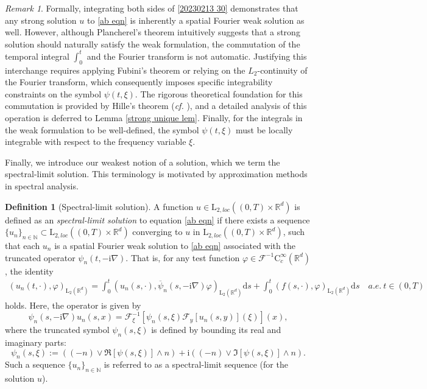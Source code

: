 \documentclass[11pt,reqno]{amsart}
\theoremstyle{definition}
\newtheorem{defn}[thm]{Definition}
\theoremstyle{remark}
\newtheorem{rem}[thm]{Remark}
\newcommand\bR{\mathbb{R}}
\numberwithin{equation}{section}
\begin{document}
\begin{rem}
									\label{strong weak rem}
Formally, integrating both sides of \eqref{20230213 30} demonstrates that any strong solution $u$ to \eqref{ab eqn} is inherently a spatial Fourier weak solution as well. 
However, although Plancherel’s theorem intuitively suggests that a strong solution should naturally satisfy the weak formulation, the commutation of the temporal integral $\int_0^t$ and the Fourier transform is not automatic. 
Justifying this interchange requires applying Fubini’s theorem or relying on the $L_2$-continuity of the Fourier transform, which consequently imposes specific integrability constraints on the symbol $\psi(t,\xi)$. 
The rigorous theoretical foundation for this commutation is provided by Hille’s theorem (\textit{cf.} \cite[Corollary V.5.2]{Yosida}), and a detailed analysis of this operation is deferred to Lemma \ref{strong unique lem}.
 Finally, for the integrals in the weak formulation to be well-defined, the symbol $\psi(t,\xi)$ must be locally integrable with respect to the frequency variable $\xi$.


\end{rem}







Finally, we introduce our weakest notion of a solution, which we term the spectral-limit solution. 
This terminology is motivated by approximation methods in spectral analysis.

\begin{defn}[Spectral-limit solution]
									\label{spectral-limit soluion}
A function $u \in \mathrm{L}_{2,loc}((0,T) \times \mathbb{R}^d)$ is defined as an \emph{spectral-limit solution} to equation \eqref{ab eqn} if there exists a sequence $\{u_n\}_{n \in \mathbb{N}} \subset \mathrm{L}_{2,loc}((0,T) \times \mathbb{R}^d)$ converging to $u$ in $\mathrm{L}_{2,loc}((0,T) \times \mathbb{R}^d)$, such that each $u_n$ is a spatial Fourier weak solution to \eqref{ab eqn} associated with the truncated operator $\psi_n(t,-\mathrm{i}\nabla)$. 
That is, for any test function  $\varphi \in \mathcal{F}^{-1}\mathrm{C}_c^\infty(\mathbb{R}^d)$, 
the identity
\begin{align*}
\left(u_n(t,\cdot),\varphi\right)_{\mathrm{L}_2(\bR^d)} =  \int_0^t \left(u_n(s,\cdot) , \overline \psi_n(s,-\mathrm{i}\nabla)\varphi \right)_{\mathrm{L}_2(\bR^d)} \mathrm{d}s 
+ \int_0^t \left( f(s,\cdot),\varphi\right)_{\mathrm{L}_2(\bR^d)} \mathrm{d}s
\quad a.e.~t\in (0,T)
\end{align*}
holds. 
Here, the operator is given by
$$
\psi_{n}(s,-\mathrm{i}\nabla)u_n(s,x) = \mathcal{F}_{\xi}^{-1} \left[  \psi_{n}(s,\xi) \mathcal{F}_y[u_n(s,y)](\xi)\right](x), 
$$
where the truncated symbol $\psi_n(s,\xi)$ is defined by bounding its real and imaginary parts:
$$
\psi_{n}(s,\xi) := \left( (-n) \vee \Re[\psi(s,\xi)] \wedge n \right)  + \mathrm{i}\left( (-n) \vee \Im[\psi(s,\xi)] \wedge n \right).
$$
Such a sequence $\{u_n\}_{n \in \mathbb{N}}$ is referred to as a spectral-limit sequence (for the solution $u$).
\end{defn}
\end{document}
